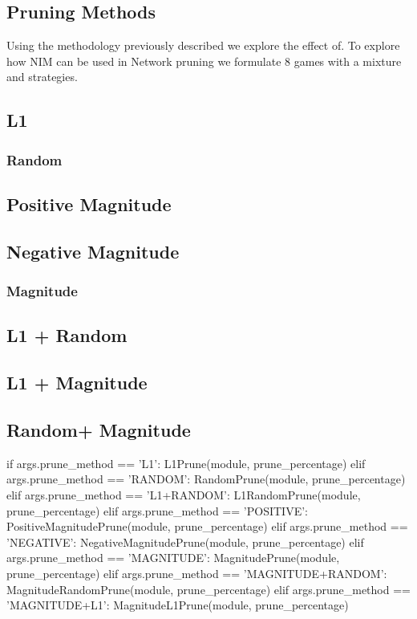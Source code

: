 \documentclass{article}
\begin{document}
\subsection{Pruning Methods}
Using the methodology previously described we explore the effect of. To explore how NIM can be used in Network pruning we formulate 8 games with a mixture and strategies. 

\subsection{L1}
\subsubsection{Random}
\subsection{Positive Magnitude}
\subsection{Negative Magnitude}
\subsubsection{Magnitude}
\subsection{L1 + Random}
\subsection{L1 + Magnitude}
\subsection{Random+ Magnitude}
if args.prune_method == 'L1': 
                            L1Prune(module, prune_percentage)
                        elif args.prune_method == 'RANDOM':
                            RandomPrune(module, prune_percentage)
                        elif args.prune_method == 'L1+RANDOM':
                            L1RandomPrune(module, prune_percentage)
                        elif args.prune_method == 'POSITIVE':
                            PositiveMagnitudePrune(module, prune_percentage)
                        elif args.prune_method == 'NEGATIVE':
                            NegativeMagnitudePrune(module, prune_percentage)
                        elif args.prune_method == 'MAGNITUDE':
                            MagnitudePrune(module, prune_percentage)
                        elif args.prune_method == 'MAGNITUDE+RANDOM':
                            MagnitudeRandomPrune(module, prune_percentage)
                        elif args.prune_method == 'MAGNITUDE+L1':
                            MagnitudeL1Prune(module, prune_percentage)
\end{document}
